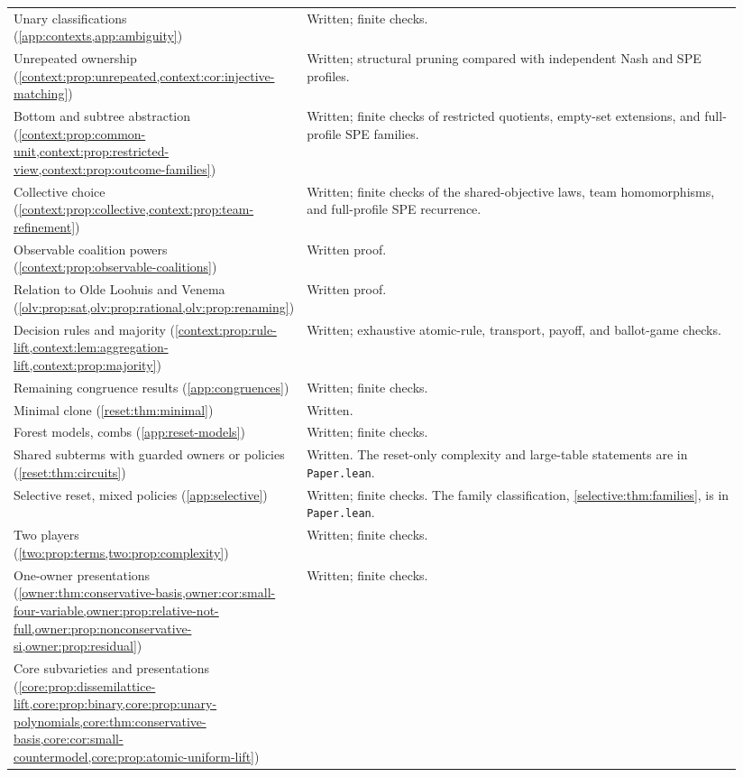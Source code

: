 {\begin{longtable}{>{\raggedright\arraybackslash}p{0.34\linewidth}>{\raggedright\arraybackslash}p{0.60\linewidth}}
Unary classifications (\cref{app:contexts,app:ambiguity})
 & Written; finite checks.\\
Unrepeated ownership (\cref{context:prop:unrepeated,context:cor:injective-matching})
 & Written; structural pruning compared with independent Nash and SPE profiles.\\
Bottom and subtree abstraction (\cref{context:prop:common-unit,context:prop:restricted-view,context:prop:outcome-families})
 & Written; finite checks of restricted quotients, empty-set extensions, and full-profile SPE families.\\
Collective choice (\cref{context:prop:collective,context:prop:team-refinement})
 & Written; finite checks of the shared-objective laws, team homomorphisms, and full-profile SPE recurrence.\\
Observable coalition powers (\cref{context:prop:observable-coalitions})
 & Written proof.\\
Relation to Olde Loohuis and Venema (\cref{olv:prop:sat,olv:prop:rational,olv:prop:renaming})
 & Written proof.\\
Decision rules and majority (\cref{context:prop:rule-lift,context:lem:aggregation-lift,context:prop:majority})
 & Written; exhaustive atomic-rule, transport, payoff, and ballot-game checks.\\
Remaining congruence results (\cref{app:congruences})
 & Written; finite checks.\\
Minimal clone (\cref{reset:thm:minimal})
 & Written.\\
Forest models, combs (\cref{app:reset-models})
 & Written; finite checks.\\
Shared subterms with guarded owners or policies (\cref{reset:thm:circuits})
 & Written. The reset-only complexity and large-table statements are in \texttt{Paper.lean}.\\
Selective reset, mixed policies (\cref{app:selective})
 & Written; finite checks. The family classification, \cref{selective:thm:families}, is in \texttt{Paper.lean}.\\
Two players (\cref{two:prop:terms,two:prop:complexity})
 & Written; finite checks.\\
One-owner presentations (\cref{owner:thm:conservative-basis,owner:cor:small-four-variable,owner:prop:relative-not-full,owner:prop:nonconservative-si,owner:prop:residual})
 & Written; finite checks.\\
Core subvarieties and presentations (\cref{core:prop:dissemilattice-lift,core:prop:binary,core:prop:unary-polynomials,core:thm:conservative-basis,core:cor:small-countermodel,core:prop:atomic-uniform-lift})

\end{longtable}}
